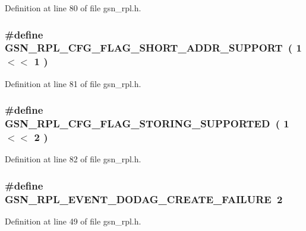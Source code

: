 Definition at line 80 of file gsn\_\-rpl.h.

\hypertarget{a00579_aedf2d3bed2620ffc71c969a4170a71a2}{
\subsubsection[{GSN\_\-RPL\_\-CFG\_\-FLAG\_\-SHORT\_\-ADDR\_\-SUPPORT}]{\setlength{\rightskip}{0pt plus 5cm}\#define GSN\_\-RPL\_\-CFG\_\-FLAG\_\-SHORT\_\-ADDR\_\-SUPPORT~( 1 $<$$<$ 1 )}}
\label{a00579_aedf2d3bed2620ffc71c969a4170a71a2}


Definition at line 81 of file gsn\_\-rpl.h.

\hypertarget{a00579_a8750ae8a007ad0ca59ed3cceda625bae}{
\subsubsection[{GSN\_\-RPL\_\-CFG\_\-FLAG\_\-STORING\_\-SUPPORTED}]{\setlength{\rightskip}{0pt plus 5cm}\#define GSN\_\-RPL\_\-CFG\_\-FLAG\_\-STORING\_\-SUPPORTED~( 1 $<$$<$ 2 )}}
\label{a00579_a8750ae8a007ad0ca59ed3cceda625bae}


Definition at line 82 of file gsn\_\-rpl.h.

\hypertarget{a00579_a8d304fa5ca5832f6f72a6fdc3801db94}{
\subsubsection[{GSN\_\-RPL\_\-EVENT\_\-DODAG\_\-CREATE\_\-FAILURE}]{\setlength{\rightskip}{0pt plus 5cm}\#define GSN\_\-RPL\_\-EVENT\_\-DODAG\_\-CREATE\_\-FAILURE~2}}
\label{a00579_a8d304fa5ca5832f6f72a6fdc3801db94}


Definition at line 49 of file gsn\_\-rpl.h.

